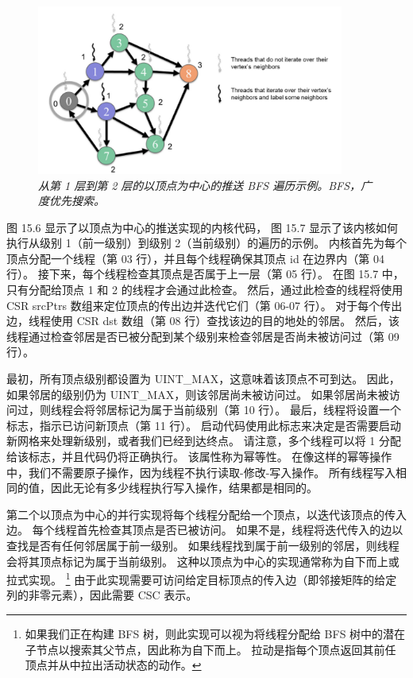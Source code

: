 \begin{figure}[H]
	\centering
	\includegraphics[width=0.9\textwidth]{figs/F15.7.png}
	\caption{\textit{从第 1 层到第 2 层的以顶点为中心的推送 BFS 遍历示例。BFS，广度优先搜索。}}
\end{figure}

图 15.6 显示了以顶点为中心的推送实现的内核代码，
图 15.7 显示了该内核如何执行从级别 1（前一级别）到级别 2（当前级别）的遍历的示例。 
内核首先为每个顶点分配一个线程（第 03 行），并且每个线程确保其顶点 id 在边界内（第 04 行）。 
接下来，每个线程检查其顶点是否属于上一层（第 05 行）。 在图 15.7 中，只有分配给顶点 1 和 2 的线程才会通过此检查。 
然后，通过此检查的线程将使用 CSR srcPtrs 数组来定位顶点的传出边并迭代它们（第 06-07 行）。 
对于每个传出边，线程使用 CSR dst 数组（第 08 行）查找该边的目的地处的邻居。 
然后，该线程通过检查邻居是否已被分配到某个级别来检查邻居是否尚未被访问过（第 09 行）。

最初，所有顶点级别都设置为 UINT\_MAX，这意味着该顶点不可到达。 
因此，如果邻居的级别仍为 UINT\_MAX，则该邻居尚未被访问过。 
如果邻居尚未被访问过，则线程会将邻居标记为属于当前级别（第 10 行）。 
最后，线程将设置一个标志，指示已访问新顶点（第 11 行）。 
启动代码使用此标志来决定是否需要启动新网格来处理新级别，或者我们已经到达终点。 
请注意，多个线程可以将 1 分配给该标志，并且代码仍将正确执行。 该属性称为幂等性。 
在像这样的幂等操作中，我们不需要原子操作，因为线程不执行读取-修改-写入操作。 
所有线程写入相同的值，因此无论有多少线程执行写入操作，结果都是相同的。

第二个以顶点为中心的并行实现将每个线程分配给一个顶点，以迭代该顶点的传入边。 每个线程首先检查其顶点是否已被访问。 
如果不是，线程将迭代传入的边以查找是否有任何邻居属于前一级别。 
如果线程找到属于前一级别的邻居，则线程会将其顶点标记为属于当前级别。 
这种以顶点为中心的实现通常称为自下而上或拉式实现。 
\footnote{如果我们正在构建 BFS 树，则此实现可以视为将线程分配给 BFS 树中的潜在子节点以搜索其父节点，因此称为自下而上。 
拉动是指每个顶点返回其前任顶点并从中拉出活动状态的动作。}
由于此实现需要可访问给定目标顶点的传入边（即邻接矩阵的给定列的非零元素），因此需要 CSC 表示。

